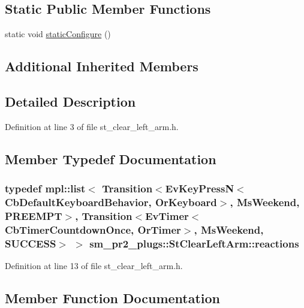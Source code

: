 \subsection*{Static Public Member Functions}
\begin{DoxyCompactItemize}
\item 
static void \hyperlink{structsm__pr2__plugs_1_1StClearLeftArm_a46e6f93715d9c6857c1222616d23c598}{static\+Configure} ()
\end{DoxyCompactItemize}
\subsection*{Additional Inherited Members}


\subsection{Detailed Description}


Definition at line 3 of file st\+\_\+clear\+\_\+left\+\_\+arm.\+h.



\subsection{Member Typedef Documentation}
\subsubsection[{\texorpdfstring{reactions}{reactions}}]{\setlength{\rightskip}{0pt plus 5cm}typedef mpl\+::list$<$ Transition$<$Ev\+Key\+PressN$<$Cb\+Default\+Keyboard\+Behavior, {\bf Or\+Keyboard}$>$, {\bf Ms\+Weekend}, {\bf P\+R\+E\+E\+M\+PT}$>$, Transition$<$Ev\+Timer$<$Cb\+Timer\+Countdown\+Once, {\bf Or\+Timer}$>$, {\bf Ms\+Weekend}, {\bf S\+U\+C\+C\+E\+SS}$>$ $>$ {\bf sm\+\_\+pr2\+\_\+plugs\+::\+St\+Clear\+Left\+Arm\+::reactions}}\hypertarget{structsm__pr2__plugs_1_1StClearLeftArm_a62cd92c51a75ac942bdc5eb9917fa002}{}\label{structsm__pr2__plugs_1_1StClearLeftArm_a62cd92c51a75ac942bdc5eb9917fa002}


Definition at line 13 of file st\+\_\+clear\+\_\+left\+\_\+arm.\+h.



\subsection{Member Function Documentation}
